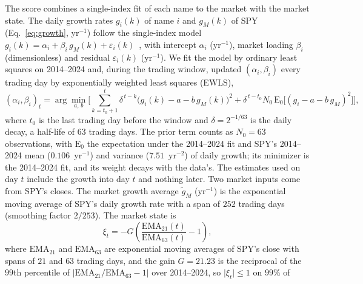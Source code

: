 The score combines a single-index fit of each name to the market with the market state. The daily growth rates
$g_i(k)$ of name $i$ and $g_M(k)$ of SPY (Eq.~\ref{eq:growth}, yr$^{-1}$) follow the single-index model
$g_i(k) = \alpha_i + \beta_i\, g_M(k) + \varepsilon_i(k)$~\cite{sharpe1963}, with intercept $\alpha_i$ (yr$^{-1}$),
market loading $\beta_i$ (dimensionless) and residual $\varepsilon_i(k)$ (yr$^{-1}$). We fit the model by ordinary
least squares on 2014--2024 and, during the trading window, updated $(\alpha_i, \beta_i)$ every trading day by
exponentially weighted least squares (EWLS),
\begin{equation}
(\alpha_i, \beta_i)_t = \arg\min_{a,\,b} \Big[ \sum_{k = t_0 + 1}^{t} \delta^{\,t-k}
  \big( g_i(k) - a - b\, g_M(k) \big)^2
  + \delta^{\,t - t_0} N_0\, \mathrm{E}_0 \big[ ( g_i - a - b\, g_M )^2 \big] \Big],
\label{eq:ewls}
\end{equation}
where $t_0$ is the last trading day before the window and $\delta = 2^{-1/63}$ is the daily decay, a half-life of
$63$ trading days. The prior term counts as $N_0 = 63$ observations, with $\mathrm{E}_0$ the expectation under the
2014--2024 fit and SPY's 2014--2024 mean ($0.106$~yr$^{-1}$) and variance ($7.51$~yr$^{-2}$) of daily growth; its
minimizer is the 2014--2024 fit, and its weight decays with the data's. The estimates used on day $t$ include the
growth into day $t$ and nothing later. Two market inputs come from SPY's closes. The market growth average
$\tilde g_M$ (yr$^{-1}$) is the exponential moving average of SPY's daily growth rate with a span of $252$ trading
days (smoothing factor $2/253$). The market state is
\begin{equation}
\xi_t = -G \left( \frac{\mathrm{EMA}_{21}(t)}{\mathrm{EMA}_{63}(t)} - 1 \right),
\label{eq:xi}
\end{equation}
where $\mathrm{EMA}_{21}$ and $\mathrm{EMA}_{63}$ are exponential moving averages of SPY's close with spans of $21$
and $63$ trading days, and the gain $G = 21.23$ is the reciprocal of the $99$th percentile of
$\lvert \mathrm{EMA}_{21}/\mathrm{EMA}_{63} - 1 \rvert$ over 2014--2024, so $\lvert\xi_t\rvert \le 1$ on $99\%$ of
